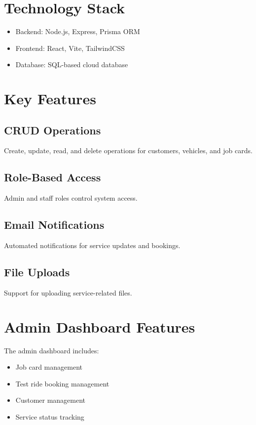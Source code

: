\documentclass[12pt,a4paper]{report}
\begin{document}
\section{Technology Stack}

\begin{itemize}
\item Backend: Node.js, Express, Prisma ORM
\item Frontend: React, Vite, TailwindCSS
\item Database: SQL-based cloud database
\end{itemize}

\section{Key Features}

\subsection{CRUD Operations}

Create, update, read, and delete operations for customers, vehicles, and job cards.

\subsection{Role-Based Access}

Admin and staff roles control system access.

\subsection{Email Notifications}

Automated notifications for service updates and bookings.

\subsection{File Uploads}

Support for uploading service-related files.

\section{Admin Dashboard Features}

The admin dashboard includes:

\begin{itemize}
\item Job card management
\item Test ride booking management
\item Customer management
\item Service status tracking
\end{itemize}
\end{document}

